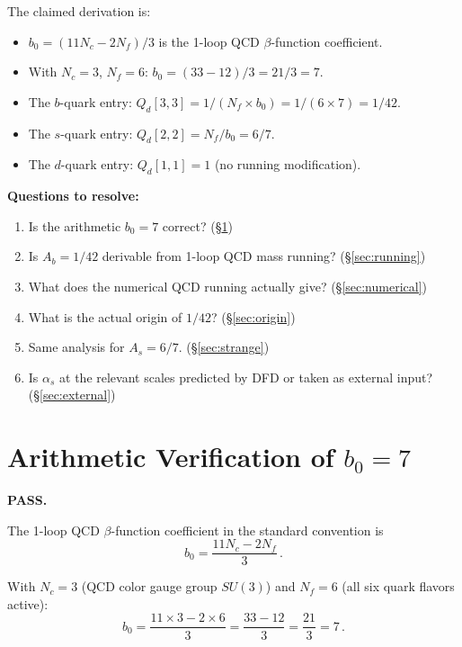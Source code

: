 \documentclass[11pt,a4paper]{article}
\newcommand{\Nf}{N_f}
\newcommand{\Nc}{N_c}
\theoremstyle{definition}
\theoremstyle{remark}
\begin{document}
The claimed derivation is:
\begin{itemize}
\item $b_0 = (11\Nc - 2\Nf)/3$ is the 1-loop QCD $\beta$-function coefficient.
\item With $\Nc = 3$, $\Nf = 6$: $b_0 = (33 - 12)/3 = 21/3 = 7$.
\item The $b$-quark entry: $Q_d[3,3] = 1/(\Nf \times b_0) = 1/(6 \times 7) = 1/42$.
\item The $s$-quark entry: $Q_d[2,2] = \Nf/b_0 = 6/7$.
\item The $d$-quark entry: $Q_d[1,1] = 1$ (no running modification).
\end{itemize}

\noindent\textbf{Questions to resolve:}
\begin{enumerate}
\item Is the arithmetic $b_0 = 7$ correct? (\S\ref{sec:arithmetic})
\item Is $A_b = 1/42$ derivable from 1-loop QCD mass running? (\S\ref{sec:running})
\item What does the numerical QCD running actually give? (\S\ref{sec:numerical})
\item What is the actual origin of $1/42$? (\S\ref{sec:origin})
\item Same analysis for $A_s = 6/7$. (\S\ref{sec:strange})
\item Is $\alpha_s$ at the relevant scales predicted by DFD or taken as external input? (\S\ref{sec:external})
\end{enumerate}

\section{Arithmetic Verification of $b_0 = 7$}
\label{sec:arithmetic}

\textcolor{pass}{\textbf{PASS.}}

The 1-loop QCD $\beta$-function coefficient in the standard convention is
\begin{equation}
b_0 = \frac{11\Nc - 2\Nf}{3}\,.
\end{equation}

With $\Nc = 3$ (QCD color gauge group $SU(3)$) and $\Nf = 6$ (all six
quark flavors active):
\begin{equation}
b_0 = \frac{11 \times 3 - 2 \times 6}{3} = \frac{33 - 12}{3} = \frac{21}{3} = 7\,.
\end{equation}
\end{document}
